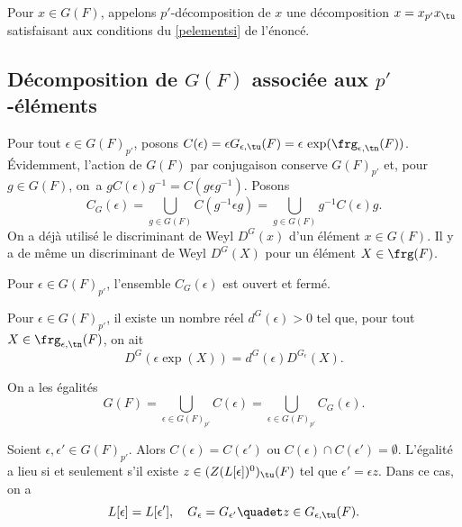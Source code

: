 Pour $x\in G(F)$, appelons $p'$-décomposition de $x$ une décomposition $x=x_{p'}x_{\tu}$ satisfaisant aux conditions du \eqref{pelementsi} de l'énoncé.

\subsection{Décomposition de \texorpdfstring{$G(F)$}{GF} associée aux \texorpdfstring{$p'$}{p'}-éléments}\label{p'decomposition}

Pour tout $\epsilon\in G(F)_{p'}$, posons $C(\epsilon)=\epsilon G_{\epsilon,\tu}(F)=\epsilon\,\exp(\frg_{\epsilon,\tn}(F))$. Évidemment, l'action de $G(F)$ par conjugaison conserve $G(F)_{p'}$ et, pour $g\in G(F)$, on~a $gC(\epsilon)g^{-1}=C(g\epsilon g^{-1})$. Posons
\[
C_{G}(\epsilon)=\bigcup_{g\in G(F)}C(g^{-1}\epsilon g)=\bigcup_{g\in G(F)}g^{-1}C(\epsilon )g.
\]
On a déjà utilisé le discriminant de Weyl $D^G(x)$ d'un élément $x\in G(F)$. Il y a de même un discriminant de Weyl $D^G(X)$ pour un élément $X\in \frg(F)$.

\skpt
\begin{lem*}
\begin{enumeratei}
\item\label{p'decompositioni}
Pour $\epsilon\in G(F)_{p'}$, l'ensemble $C_{G}(\epsilon) $ est ouvert et fermé.

\item\label{p'decompositionii}
Pour $\epsilon\in G(F)_{p'}$, il existe un nombre réel $d^G(\epsilon)>0$ tel que, pour tout $X\in \frg_{\epsilon,\tn}(F)$, on ait
\[
D^G(\epsilon \exp(X))=d^G(\epsilon)D^{G_{\epsilon}}(X).
\]

\item\label{p'decompositioniii}
On a les égalités
\[
G(F)=\bigcup_{\epsilon\in G(F)_{p'}}C(\epsilon)=\bigcup_{\epsilon\in G(F)_{p'}}C_{G}(\epsilon).
\]

\item\label{p'decompositioniv}
Soient $\epsilon ,\epsilon '\in G(F)_{p'}$. Alors $C(\epsilon )=C(\epsilon ')$ ou $C(\epsilon )\cap C(\epsilon ')=\emptyset$. L'égalité a lieu si et seulement s'il existe $z\in (Z(L[\epsilon ])^0)_{\tu}(F)$ tel que $\epsilon '=\epsilon z$. Dans ce cas, on a
\[
L[\epsilon ]=L[\epsilon '],\quad G_{\epsilon}=G_{\epsilon'}\quadet z\in G_{\epsilon,\tu}(F).
\]
\end{enumeratei}
\end{lem*}

